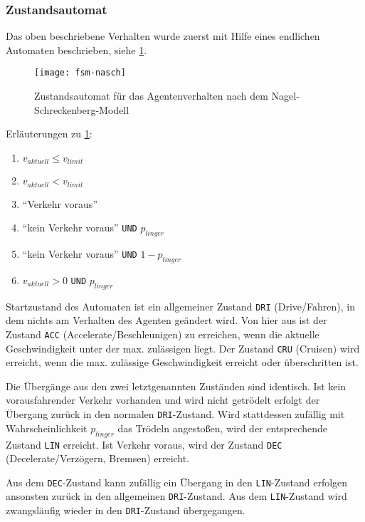 \subsubsection{Zustandsautomat}

Das oben beschriebene Verhalten wurde zuerst mit Hilfe eines endlichen Automaten beschrieben, siehe \cref{figure:fsm-nasch}.

\begin{figure}[hptb]
 \centering
 \texttt{[image: fsm-nasch]}
 \caption[Zustandsautomat für das Agentenverhalten]
 		{Zustandsautomat für das Agentenverhalten nach dem Nagel-Schreckenberg-Modell}
 \label{figure:fsm-nasch}
\end{figure}

\noindent
Erläuterungen zu \cref{figure:fsm-nasch}:
\begin{enumerate}
\itemsep0em
	\item  $ v_{aktuell}  \leq  v_{limit} $
	\item  $ v_{aktuell}  <  v_{limit} $
	\item  \enquote{Verkehr voraus}
	\item  \enquote{kein Verkehr voraus} \texttt{UND} $ p_{linger} $
	\item  \enquote{kein Verkehr voraus} \texttt{UND} $ 1 - p_{linger} $
	\item  $ v_{aktuell}  > 0 $ \texttt{UND} $ p_{linger} $
\end{enumerate}

Startzustand des Automaten ist ein allgemeiner Zustand \texttt{DRI} (Drive/Fahren), in dem nichts am Verhalten des Agenten geändert wird.
Von hier aus ist der Zustand \texttt{ACC} (Accelerate/Beschleunigen) zu erreichen, wenn die aktuelle Geschwindigkeit unter der max. zulässigen liegt. 
Der Zustand \texttt{CRU} (Cruisen) wird erreicht, wenn die max. zulässige Geschwindigkeit erreicht oder überschritten ist.

Die Übergänge aus den zwei letztgenannten Zuständen sind identisch. 
Ist kein vorausfahrender Verkehr vorhanden und wird nicht getrödelt erfolgt der Übergang zurück in den normalen \texttt{DRI}-Zustand.
Wird stattdessen zufällig mit Wahrscheinlichkeit $ p_{linger} $ das Trödeln angestoßen, wird der entsprechende Zustand \texttt{LIN} erreicht.
Ist Verkehr voraus, wird der Zustand \texttt{DEC} (Decelerate/Verzögern, Bremsen) erreicht.

Aus dem \texttt{DEC}-Zustand kann zufällig ein Übergang in den \texttt{LIN}-Zustand erfolgen ansonsten zurück in den allgemeinen \texttt{DRI}-Zustand.
Aus dem \texttt{LIN}-Zustand wird zwangsläufig wieder in den \texttt{DRI}-Zustand übergegangen.


